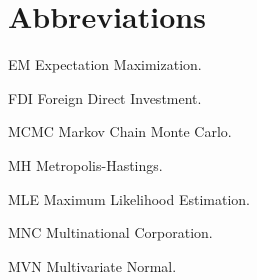 \abbreviations





\section*{Abbreviations}

\begin{symbollist}
  \item[EM] Expectation Maximization.
	\item[FDI] Foreign Direct Investment.
	\item[MCMC] Markov Chain Monte Carlo.
  \item[MH] Metropolis-Hastings.
	\item[MLE] Maximum Likelihood Estimation.
  \item[MNC] Multinational Corporation.
  \item[MVN] Multivariate Normal.
\end{symbollist}

